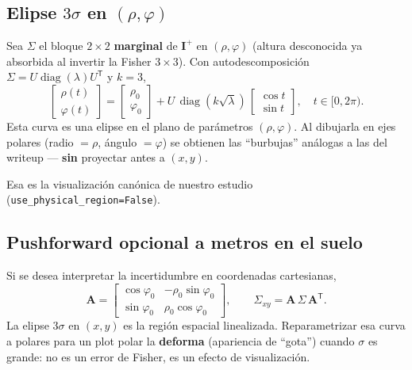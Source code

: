 \documentclass[11pt,a4paper]{article}
\theoremstyle{definition}
\newcommand{\matr}[1]{\mathbf{#1}}
\DeclareMathOperator{\diag}{diag}
\begin{document}
\subsection{Elipse $3\sigma$ en $(\rho,\varphi)$}
Sea $\Sigma$ el bloque $2\times 2$ \textbf{marginal} de $\matr{I}^{+}$ en
$(\rho,\varphi)$ (altura desconocida ya absorbida al invertir la Fisher $3\times 3$).
Con autodescomposici\'on $\Sigma=U\diag(\lambda)U^{\mathsf T}$ y $k=3$,
\begin{equation}
    \begin{bmatrix}\rho(t)\\ \varphi(t)\end{bmatrix}
    =
    \begin{bmatrix}\rho_0\\ \varphi_0\end{bmatrix}
    +
    U\,\diag(k\sqrt{\lambda})\,
    \begin{bmatrix}\cos t\\ \sin t\end{bmatrix},
    \quad
    t\in[0,2\pi).
    \label{eq:ellipse-param}
\end{equation}
Esta curva es una elipse en el plano de par\'ametros $(\rho,\varphi)$.
Al dibujarla en ejes polares (radio $=\rho$, \'angulo $=\varphi$) se obtienen
las ``burbujas'' an\'alogas a las del writeup --- \textbf{sin} proyectar antes
a $(x,y)$.

Esa es la visualizaci\'on can\'onica de nuestro estudio
(\texttt{use\_physical\_region=False}).

\subsection{Pushforward opcional a metros en el suelo}
Si se desea interpretar la incertidumbre en coordenadas cartesianas,
\begin{equation}
    \matr{A}
    =
    \begin{bmatrix}
        \cos\varphi_0 & -\rho_0\sin\varphi_0 \\
        \sin\varphi_0 & \rho_0\cos\varphi_0
    \end{bmatrix},
    \qquad
    \Sigma_{xy}
    =
    \matr{A}\,\Sigma\,\matr{A}^{\mathsf T}.
\end{equation}
La elipse $3\sigma$ en $(x,y)$ es la regi\'on espacial linealizada.
Reparametrizar esa curva a polares para un plot polar la \textbf{deforma}
(apariencia de ``gota'') cuando $\sigma$ es grande: no es un error de Fisher,
es un efecto de visualizaci\'on.
\end{document}
